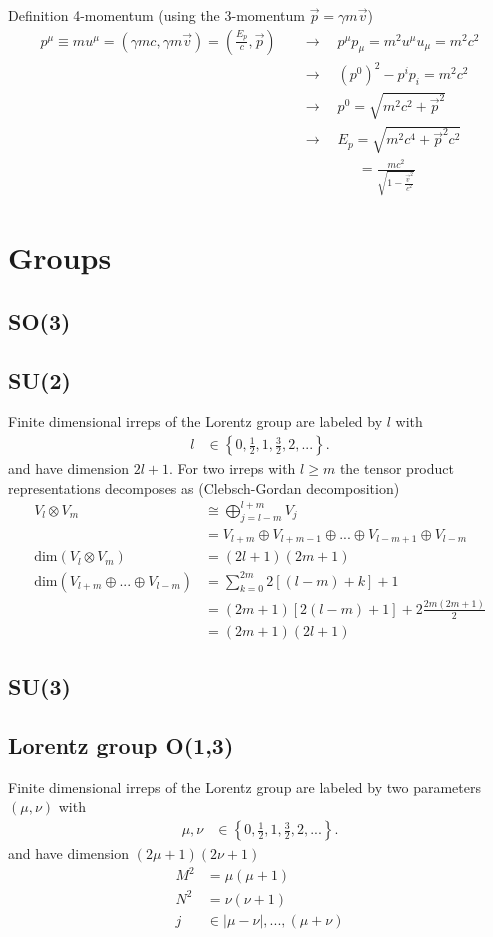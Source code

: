 \documentclass[10pt,a4paper]{article}
\theoremstyle{definition}
\begin{document}
Definition 4-momentum (using the 3-momentum $\vec{p}=\gamma m\vec{v}$)
\begin{align}
    p^\mu \equiv mu^\mu=(\gamma mc,\gamma m\vec{v})=\left(\frac{E_p}{c},\vec{p}\right)\quad&\rightarrow\quad p^\mu p _\mu=m^2u^\mu u_\mu=m^2c^2\\
    &\rightarrow\quad (p^0)^2-p^ip_i=m^2c^2\\
    &\rightarrow\quad p^0=\sqrt{m^2c^2+\vec{p}^2}\\
    &\rightarrow\quad E_p=\sqrt{m^2c^4+\vec{p}^2c^2}\\
    &\qquad\qquad=\frac{mc^2}{\sqrt{1-\frac{\vec{v}^2}{c^2}}}
\end{align}

\section{Groups}
\subsection{SO(3)}

\subsection{SU(2)}
Finite dimensional irreps of the Lorentz group are labeled by $l$ with
\begin{align}
    l &\in \left\{0,\frac{1}{2},1,\frac{3}{2},2,...\right\}.
\end{align}
and have dimension $2l+1$. For two irreps with $l\ge m$ the tensor product representations decomposes as ({\sc Clebsch-Gordan} decomposition)
\begin{align}
    V_l \otimes V_m &\cong \bigoplus_{j=l-m}^{l+m} V_j\\
    &=V_{l+m}\oplus V_{l+m-1}\oplus ... \oplus V_{l-m+1}\oplus V_{l-m}\\
    \text{dim}(V_l \otimes V_m)&=(2l+1)(2m+1)\\
    \text{dim}(V_{l+m} \oplus ...\oplus V_{l-m})&=\sum_{k=0}^{2m}2[(l-m)+k]+1\\
    &=(2m+1)[2(l-m)+1]+2\frac{2m(2m+1)}{2}\\
    &=(2m+1)(2l+1)
\end{align}

\subsection{SU(3)}

\subsection{Lorentz group O(1,3)}
Finite dimensional irreps of the Lorentz group are labeled by two parameters $(\mu,\nu)$ with
\begin{align}
    \mu,\nu &\in \left\{0,\frac{1}{2},1,\frac{3}{2},2,...\right\}.
\end{align}
and have dimension $(2\mu+1)(2\nu+1)$
\begin{align*}
    M^2&=\mu(\mu+1)\\
    N^2&=\nu(\nu+1)\\
    j  &\in |\mu-\nu|, ..., (\mu+\nu)
\end{align*}
\end{document}
